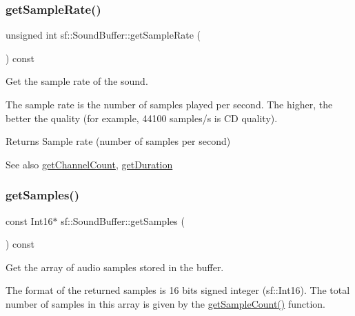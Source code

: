 \subsubsection{\texorpdfstring{getSampleRate()}{getSampleRate()}}
{\footnotesize\ttfamily unsigned int sf\+::\+Sound\+Buffer\+::get\+Sample\+Rate (\begin{DoxyParamCaption}{ }\end{DoxyParamCaption}) const}



Get the sample rate of the sound. 

The sample rate is the number of samples played per second. The higher, the better the quality (for example, 44100 samples/s is CD quality).

\begin{DoxyReturn}{Returns}
Sample rate (number of samples per second)
\end{DoxyReturn}
\begin{DoxySeeAlso}{See also}
\mbox{\hyperlink{classsf_1_1_sound_buffer_a127707b831d875ed790eef1aa2b9fcc3}{get\+Channel\+Count}}, \mbox{\hyperlink{classsf_1_1_sound_buffer_a280a581d9b360fd16121714c51fc8261}{get\+Duration}} \begin{DoxyVerb}\end{DoxyVerb}
 
\end{DoxySeeAlso}
\mbox{\label{classsf_1_1_sound_buffer_ab9b2525a8da64cb266ba728aff7adecb}} 
\subsubsection{\texorpdfstring{getSamples()}{getSamples()}}
{\footnotesize\ttfamily const Int16$\ast$ sf\+::\+Sound\+Buffer\+::get\+Samples (\begin{DoxyParamCaption}{ }\end{DoxyParamCaption}) const}



Get the array of audio samples stored in the buffer. 

The format of the returned samples is 16 bits signed integer (sf\+::\+Int16). The total number of samples in this array is given by the \mbox{\hyperlink{classsf_1_1_sound_buffer_aebe2a4bdbfbd9249353748da3f6a4fa1}{get\+Sample\+Count()}} function.

